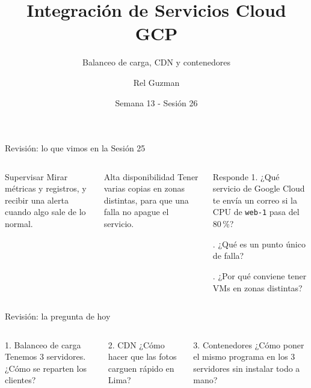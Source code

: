 \documentclass[aspectratio=169,10pt,c]{beamer}
\title{Integración de Servicios Cloud GCP}
\subtitle{Balanceo de carga, CDN y contenedores}
\date{Semana 13 - Sesión 26}
\author{Rel Guzman}
\begin{document}
{\maketitle}

\begin{frame}{Revisión: lo que vimos en la Sesión 25}
\begin{columns}[T,onlytextwidth]
\begin{block}{Supervisar}
\small Mirar métricas y registros, y recibir una alerta cuando algo sale de lo normal.
\end{block}
\begin{block}{Alta disponibilidad}
\small Tener varias copias en zonas distintas, para que una falla no apague el servicio.
\end{block}
\begin{alertblock}{Responde}
\small
1. ¿Qué servicio de Google Cloud te envía un correo si la CPU de \texttt{web-1} pasa del 80\,\%?\par{}. ¿Qué es un punto único de falla?\par{}. ¿Por qué conviene tener VMs en zonas distintas?
\end{alertblock}
\end{columns}
\end{frame}

\begin{frame}{Revisión: la pregunta de hoy}
\begin{center}
\end{center}
\vspace{3mm}
\begin{columns}[T,onlytextwidth]
\begin{block}{1. Balanceo de carga}
\small Tenemos 3 servidores. ¿Cómo se reparten los clientes?
\end{block}
\begin{block}{2. CDN}
\small ¿Cómo hacer que las fotos carguen rápido en Lima?
\end{block}
\begin{block}{3. Contenedores}
\small ¿Cómo poner el mismo programa en los 3 servidores sin instalar todo a mano?
\end{block}
\end{columns}
\end{frame}
\end{document}
